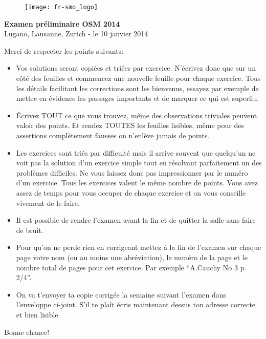 \documentclass[12pt,a4paper]{article}
\begin{document}
\thispagestyle{empty}
\begin{figure}[h]
\texttt{[image: fr-smo\_logo]}
\end{figure}

\vspace{1cm}

\begin{center}
\Huge{\textbf{Examen préliminaire OSM 2014}}\\[1.5cm]
\large{Lugano, Lausanne, Zurich - le 10 janvier 2014}\\[3.5cm]
\end{center}


Merci de respecter les points suivants:

\begin{itemize}
\item Vos solutions seront copiées et triées par exercice. N'écrivez
donc que sur un côté des feuilles et commencez une nouvelle
feuille pour chaque exercice. Tous les détails facilitant les
corrections sont les bienvenus, essayez par exemple de mettre en
évidence les passages importants et de marquer ce qui est superflu.

\item Écrivez TOUT ce que vous trouvez, même des observations
triviales peuvent valoir des points. Et rendez TOUTES les feuilles
lisibles, même pour des assertions complètement fausses on n'enlève
jamais de points.

\item Les exercices sont triés par difficulté mais il arrive souvent
que quelqu'un ne voit pas la solution d'un exercice simple tout en
résolvant parfaitement un des problèmes difficiles. Ne vous laissez
donc pas impressionner par le numéro d'un exercice. Tous les
exercices valent le même nombre de points. Vous avez assez de temps
pour vous occuper de chaque exercice et on vous conseille vivement
de le faire.

\item Il est possible de rendre l'examen avant la fin et de quitter
la salle sans faire de bruit.

\item Pour qu'on ne perde rien en corrigeant mettez à la fin de
l'examen sur chaque page votre nom (ou au moins une abréviation), le
numéro de la page et le nombre total de pages pour cet exercice. Par
exemple "`A.Cauchy No 3 p. 2/4"'.

\item On va t'envoyer ta copie corrigée la semaine suivant l'examen
dans l'enveloppe ci-joint. S'il te plaît écris maintenant dessus ton
adresse correcte et bien lisible.

\end{itemize}

\vspace{0.5cm}

\begin{center}
Bonne chance!
\end{center}
\end{document}
